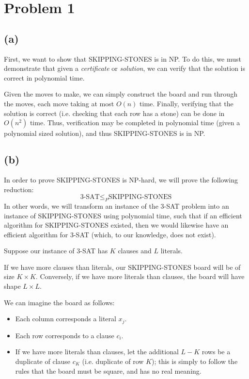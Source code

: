 \documentclass{6046}
\author{Matthew Feng}
\begin{document}
\section*{Problem 1}
\subsection*{(a)}
First, we want to show
that SKIPPING-STONES is in NP. To do this,
we must demonstrate that given a
{\it certificate} or {\it solution}, we
can verify that the solution is correct in
polynomial time.

Given the moves to make, we can simply construct
the board and run through the moves, each move
taking at most $O(n)$ time. Finally, verifying
that the solution is correct (i.e. checking
that each row has a stone) can be done in
$O(n^2)$ time. Thus, verification may
be completed in polynomial time (given
a polynomial sized solution),
and thus SKIPPING-STONES is in NP.

\subsection*{(b)}
In order to prove SKIPPING-STONES is NP-hard, we
will prove the following
reduction:
$$\text{3-SAT} \le_P \text{SKIPPING-STONES}$$
In other words, we will transform an instance
of the 3-SAT problem into an instance of
SKIPPING-STONES using polynomial time, such
that if an efficient algorithm for SKIPPING-STONES
existed, then we would likewise have an
efficient algorithm for 3-SAT (which,
to our knowledge, does not exist).

Suppose our instance of 3-SAT has $K$ clauses
and $L$ literals.

If we have more clauses than literals, our
SKIPPING-STONES board will be of size
$K \times K$. Conversely, if we have more literals
than clauses, the board will have shape
$L \times L$.

We can imagine the board as follows:
\vspace{-1em}
\begin{itemize}[noitemsep]
    \item Each column corresponds a literal $x_j$.
    \item Each row corresponds to a clause $c_i$.
    \item If we have more literals than clauses,
    let the additional $L - K$ rows be a
    duplicate of clause $c_K$ (i.e. duplicate
    of row $K$); this is simply
    to follow the rules that the board must be square,
    and has no real meaning.
\end{itemize}
\end{document}
